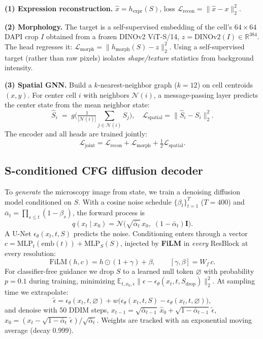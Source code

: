 \documentclass[10pt,twocolumn]{article}
\begin{document}
\noindent\textbf{(1) Expression reconstruction.} $\hat{x}=h_{\text{expr}}(S)$,
loss $\mathcal{L}_{\text{recon}}=\lVert \hat{x}-x\rVert_2^2$.

\noindent\textbf{(2) Morphology.} The target is a self-supervised embedding of
the cell's $64{\times}64$ DAPI crop $I$ obtained from a frozen DINOv2 ViT-S/14,
$z=\mathrm{DINOv2}(I)\in\mathbb{R}^{384}$. The head regresses it:
$\mathcal{L}_{\text{morph}}=\lVert h_{\text{morph}}(S)-z\rVert_2^2$. Using a
self-supervised target (rather than raw pixels) isolates \emph{shape/texture}
statistics from background intensity.

\noindent\textbf{(3) Spatial GNN.} Build a $k$-nearest-neighbor graph
($k{=}12$) on cell centroids $(x,y)$. For center cell $i$ with neighbors
$\mathcal{N}(i)$, a message-passing layer predicts the center state from the
mean neighbor state:
\begin{equation}
\hat{S}_i \;=\; g\Big(\tfrac{1}{|\mathcal N(i)|}\!\!\sum_{j\in\mathcal N(i)}\! S_j\Big),\quad
\mathcal{L}_{\text{spatial}}=\lVert \hat S_i - S_i\rVert_2^2 .
\end{equation}
The encoder and all heads are trained jointly:
\begin{equation}
\mathcal{L}_{\text{joint}}=\mathcal{L}_{\text{recon}}+\mathcal{L}_{\text{morph}}+\tfrac12\mathcal{L}_{\text{spatial}}.
\end{equation}

\subsection{S-conditioned CFG diffusion decoder}
To \emph{generate} the microscopy image from state, we train a denoising
diffusion model conditioned on $S$. With a cosine noise schedule
$\{\beta_t\}_{t=1}^{T}$ ($T{=}400$) and
$\bar\alpha_t=\prod_{s\le t}(1-\beta_s)$, the forward process is
\begin{equation}
q(x_t\mid x_0)=\mathcal N\!\big(\sqrt{\bar\alpha_t}\,x_0,\;(1-\bar\alpha_t)\mathbf I\big).
\end{equation}
A U-Net $\epsilon_\theta(x_t,t,S)$ predicts the noise. Conditioning enters
through a vector $c=\mathrm{MLP}_t(\text{emb}(t))+\mathrm{MLP}_S(S)$, injected by
\textbf{FiLM} in \emph{every} ResBlock at every resolution:
\begin{equation}
\mathrm{FiLM}(h,c)=h\odot(1+\gamma)+\beta,\qquad [\gamma,\beta]=W_{\!f}\,c .
\end{equation}
For classifier-free guidance we drop $S$ to a learned null token $\varnothing$
with probability $p{=}0.1$ during training, minimizing
$\mathbb E_{t,x_0,\epsilon}\lVert\epsilon-\epsilon_\theta(x_t,t,S_{\text{drop}})\rVert_2^2$.
At sampling time we extrapolate:
\begin{equation}
\tilde\epsilon = \epsilon_\theta(x_t,t,\varnothing) + w\big(\epsilon_\theta(x_t,t,S)-\epsilon_\theta(x_t,t,\varnothing)\big),
\end{equation}
and denoise with 50 DDIM steps,
$x_{t-1}=\sqrt{\bar\alpha_{t-1}}\,\hat x_0+\sqrt{1-\bar\alpha_{t-1}}\,\tilde\epsilon$,
$\hat x_0=(x_t-\sqrt{1-\bar\alpha_t}\,\tilde\epsilon)/\sqrt{\bar\alpha_t}$.
Weights are tracked with an exponential moving average (decay $0.999$).
\end{document}
